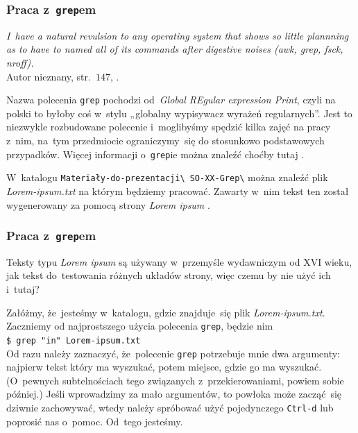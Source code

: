 \documentclass[10pt,t]{beamer}
\begin{document}
\begin{frame}
  \frametitle{Praca z~\texttt{grep}em}


  \textit{I~have a natural revulsion to any operating system that shows so
    little plannning as to have to named all of its commands after digestive
    noises (awk, grep, fsck, nroff).} \\
    Autor nieznany, str.~$147$,
    \parencite{Garfinkel-Weise-Strassmann-The-UNIX-HATERS-Handbook-Pub-1994}.

  Nazwa polecenia \texttt{grep} pochodzi od~\textit{Global REgular
    expression Print}, czyli na polski to byłoby coś w~stylu „globalny
  wypisywacz wyrażeń regularnych”. Jest to niezwykle rozbudowane polecenie
  i~moglibyśmy spędzić kilka zajęć na pracy z~nim, na~tym przedmiocie
  ograniczymy~się do stosunkowo podstawowych przypadków. Więcej informacji
  o~\texttt{grep}ie można znaleźć choćby tutaj
  \parencite{Pankaj-Wailia-Mastering-Grep-command-in-Linux-Unix-ETC-Ver-2025}.

  W~katalogu \texttt{Materiały-do-prezentacji\textbackslash
    SO-XX-Grep\textbackslash} można znaleźć plik \textit{Lorem-ipsum.txt}
  na którym będziemy pracować. Zawarty w~nim tekst ten został wygenerowany
  za pomocą strony \textit{Lorem ipsum}
  .

\end{frame}





\begin{frame}
  \frametitle{Praca z~\texttt{grep}em}

  Teksty typu \textit{Lorem ipsum} są używany w~przemyśle wydawniczym od
  XVI wieku, jak tekst do~testowania różnych układów strony, więc czemu by
  nie użyć ich i~tutaj?

  Załóżmy, że~jesteśmy w~katalogu, gdzie znajduje~się plik
  \textit{Lorem-ipsum.txt}. Zaczniemy od najprostszego użycia polecenia
  \texttt{grep}, będzie nim \\
  \texttt{\$ grep "in" Lorem-ipsum.txt} \\
  Od razu należy zaznaczyć, że~polecenie \texttt{grep} potrzebuje mnie dwa
  argumenty: najpierw tekst który ma wyszukać, potem miejsce, gdzie go ma
  wyszukać. (O~pewnych subtelnościach tego związanych z~przekierowaniami,
  powiem sobie później.) Jeśli wprowadzimy za mało argumentów, to powłoka
  może zacząć~się dziwnie zachowywać, wtedy należy spróbować użyć
  pojedynczego \texttt{Ctrl-d} lub poprosić nas o~pomoc. Od~tego jesteśmy.

\end{frame}
\end{document}
